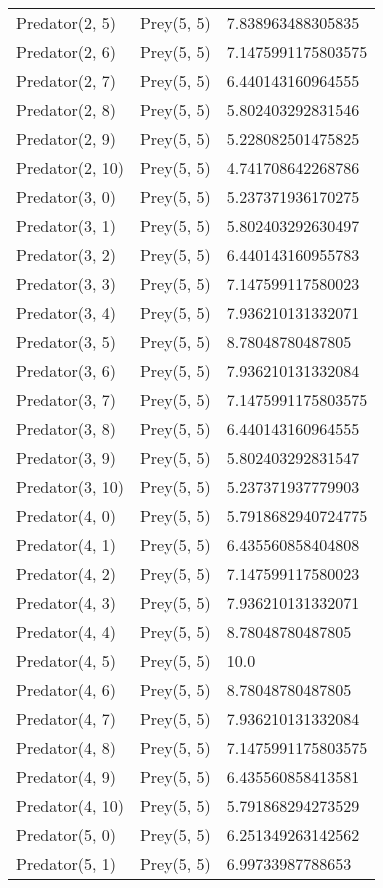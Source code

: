 \begin{longtable}{| p{} | p{} | p{} |}
Predator(2, 5) & Prey(5, 5) &7.838963488305835\\
Predator(2, 6) & Prey(5, 5) &7.1475991175803575\\
Predator(2, 7) & Prey(5, 5) &6.440143160964555\\
Predator(2, 8) & Prey(5, 5) &5.802403292831546\\
Predator(2, 9) & Prey(5, 5) &5.228082501475825\\
Predator(2, 10) & Prey(5, 5) &4.741708642268786\\
Predator(3, 0) & Prey(5, 5) &5.237371936170275\\
Predator(3, 1) & Prey(5, 5) &5.802403292630497\\
Predator(3, 2) & Prey(5, 5) &6.440143160955783\\
Predator(3, 3) & Prey(5, 5) &7.147599117580023\\
Predator(3, 4) & Prey(5, 5) &7.936210131332071\\
Predator(3, 5) & Prey(5, 5) &8.78048780487805\\
Predator(3, 6) & Prey(5, 5) &7.936210131332084\\
Predator(3, 7) & Prey(5, 5) &7.1475991175803575\\
Predator(3, 8) & Prey(5, 5) &6.440143160964555\\
Predator(3, 9) & Prey(5, 5) &5.802403292831547\\
Predator(3, 10) & Prey(5, 5) &5.237371937779903\\
Predator(4, 0) & Prey(5, 5) &5.7918682940724775\\
Predator(4, 1) & Prey(5, 5) &6.435560858404808\\
Predator(4, 2) & Prey(5, 5) &7.147599117580023\\
Predator(4, 3) & Prey(5, 5) &7.936210131332071\\
Predator(4, 4) & Prey(5, 5) &8.78048780487805\\
Predator(4, 5) & Prey(5, 5) &10.0\\
Predator(4, 6) & Prey(5, 5) &8.78048780487805\\
Predator(4, 7) & Prey(5, 5) &7.936210131332084\\
Predator(4, 8) & Prey(5, 5) &7.1475991175803575\\
Predator(4, 9) & Prey(5, 5) &6.435560858413581\\
Predator(4, 10) & Prey(5, 5) &5.791868294273529\\
Predator(5, 0) & Prey(5, 5) &6.251349263142562\\
Predator(5, 1) & Prey(5, 5) &6.99733987788653\\

\end{longtable}
